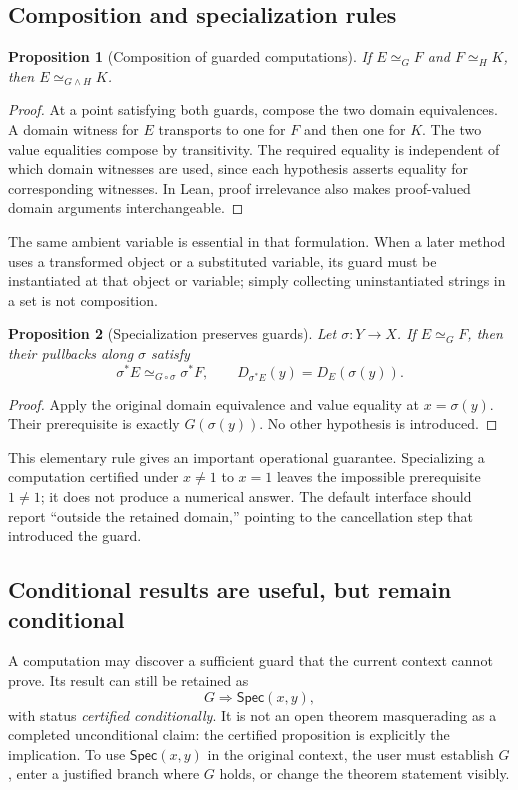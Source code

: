 \documentclass[11pt,a4paper]{article}
\newcommand{\Spec}{\mathsf{Spec}}
\newtheorem{proposition}{Proposition}[section]
\theoremstyle{remark}
\begin{document}
\subsection{Composition and specialization rules}
\begin{proposition}[Composition of guarded computations]
If $E\simeq_G F$ and $F\simeq_H K$, then
$E\simeq_{G\wedge H}K$.
\end{proposition}
\begin{proof}
At a point satisfying both guards, compose the two domain equivalences.
A domain witness for $E$ transports to one for $F$ and then one for $K$.
The two value equalities compose by transitivity. The required equality is
independent of which domain witnesses are used, since each hypothesis asserts
equality for corresponding witnesses. In Lean, proof irrelevance also makes
proof-valued domain arguments interchangeable.
\end{proof}

The same ambient variable is essential in that formulation. When a later method
uses a transformed object or a substituted variable, its guard must be
instantiated at that object or variable; simply collecting uninstantiated strings
in a set is not composition.

\begin{proposition}[Specialization preserves guards]
Let $\sigma:Y\to X$. If $E\simeq_G F$, then their pullbacks along $\sigma$ satisfy
\[
 \sigma^*E\simeq_{G\circ\sigma}\sigma^*F,
 \qquad D_{\sigma^*E}(y)=D_E(\sigma(y)).
\]
\end{proposition}
\begin{proof}
Apply the original domain equivalence and value equality at $x=\sigma(y)$.
Their prerequisite is exactly $G(\sigma(y))$. No other hypothesis is introduced.
\end{proof}

This elementary rule gives an important operational guarantee. Specializing a
computation certified under $x\ne1$ to $x=1$ leaves the impossible prerequisite
$1\ne1$; it does not produce a numerical answer. The default interface should
report ``outside the retained domain,'' pointing to the cancellation step that
introduced the guard.

\subsection{Conditional results are useful, but remain conditional}
A computation may discover a sufficient guard that the current context cannot
prove. Its result can still be retained as
\[
 G\Longrightarrow\Spec(x,y),
\]
with status \emph{certified conditionally}. It is not an open theorem masquerading
as a completed unconditional claim: the certified proposition is explicitly the
implication. To use $\Spec(x,y)$ in the original context, the user must establish
$G$, enter a justified branch where $G$ holds, or change the theorem statement
visibly.
\end{document}
